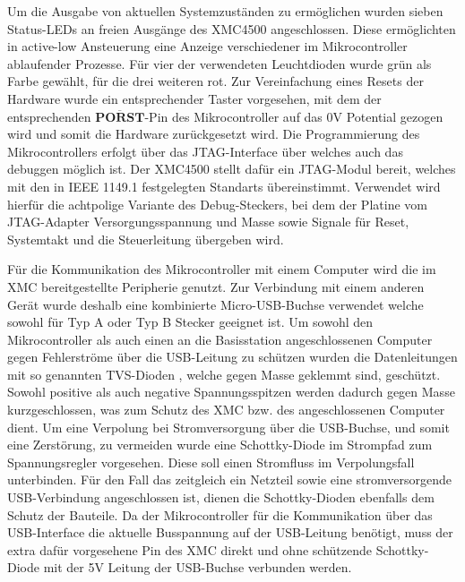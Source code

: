 Um die Ausgabe von aktuellen Systemzuständen zu ermöglichen wurden sieben Status-LEDs an freien Ausgänge des XMC4500  angeschlossen. Diese ermöglichten in active-low Ansteuerung eine Anzeige verschiedener im Mikrocontroller ablaufender Prozesse. Für vier der verwendeten Leuchtdioden wurde grün als Farbe gewählt, für die drei weiteren rot. Zur Vereinfachung eines Resets der Hardware wurde ein entsprechender Taster vorgesehen, mit dem der entsprechenden  $\overline{\textbf{PORST}}$-Pin des Mikrocontroller auf das 0V Potential gezogen wird und somit die Hardware zurückgesetzt wird.
Die Programmierung des Mikrocontrollers erfolgt über das \ac{JTAG}-Interface über welches auch das debuggen möglich ist. Der XMC4500 stellt dafür ein \ac{JTAG}-Modul bereit, welches mit den in IEEE 1149.1 festgelegten Standarts übereinstimmt. Verwendet wird hierfür die achtpolige Variante des Debug-Steckers, bei dem der Platine vom \ac{JTAG}-Adapter Versorgungsspannung und Masse sowie Signale für Reset, Systemtakt und die Steuerleitung übergeben wird.  %


Für die Kommunikation des Mikrocontroller mit einem Computer wird die im XMC  bereitgestellte Peripherie genutzt. Zur Verbindung mit einem anderen Gerät wurde deshalb eine kombinierte Micro-USB-Buchse verwendet welche sowohl für Typ A oder Typ B Stecker geeignet ist.
Um sowohl den Mikrocontroller als auch einen an die Basisstation angeschlossenen Computer gegen Fehlerströme über die USB-Leitung zu schützen wurden die Datenleitungen mit so genannten \ac{TVS}-Dioden , welche gegen Masse geklemmt sind, geschützt. Sowohl positive als auch negative Spannungsspitzen werden dadurch gegen Masse kurzgeschlossen, was zum Schutz des XMC bzw. des angeschlossenen Computer dient. Um eine Verpolung bei Stromversorgung über die USB-Buchse, und somit eine Zerstörung, zu vermeiden wurde eine Schottky-Diode im Strompfad zum Spannungsregler vorgesehen. Diese soll einen Stromfluss im Verpolungsfall unterbinden. Für den Fall das zeitgleich ein Netzteil sowie eine stromversorgende USB-Verbindung angeschlossen ist, dienen die Schottky-Dioden ebenfalls dem Schutz der Bauteile. Da der Mikrocontroller für die Kommunikation über das USB-Interface die aktuelle Busspannung auf der USB-Leitung benötigt, muss der extra dafür vorgesehene Pin des XMC direkt und ohne schützende Schottky-Diode mit der 5V Leitung der USB-Buchse verbunden werden. 


